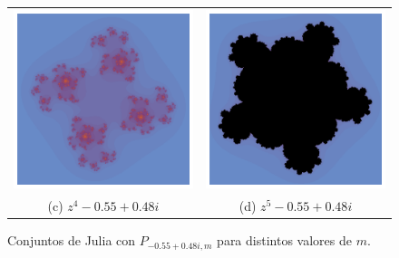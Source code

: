 \begin{figure}[ht]
\begin{tabular}{cc}
  \includegraphics[scale=0.4]{./img/C3/julia-generalizado-4.png} &   \includegraphics[scale=0.4]{./img/C3/julia-generalizado-5.png} \\
  (c) $z^4-0.55+0.48i$ & (d) $z^5-0.55+0.48i$ \\[6pt]
  \end{tabular}
  \caption{Conjuntos de Julia con $P_{-0.55+0.48i, m}$ para distintos valores de $m$.}
  \label{fig:julia-generalizados}
\end{figure}


